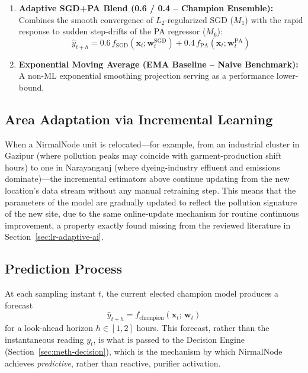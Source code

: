\begin{enumerate}[label=\textbf{M\arabic*:},leftmargin=*]
    \item \textbf{Adaptive SGD+PA Blend (0.6 / 0.4 -- Champion Ensemble):} Combines the smooth convergence of $L_2$-regularized SGD ($M_1$) with the rapid response to sudden step-drifts of the PA regressor ($M_6$):
    \begin{equation}
    \hat{y}_{t+h} = 0.6\, f_{\text{SGD}}(\mathbf{x}_t; \mathbf{w}_t^{\text{SGD}}) + 0.4\, f_{\text{PA}}(\mathbf{x}_t; \mathbf{w}_t^{\text{PA}})
    \label{eq:blend}
    \end{equation}
    \item \textbf{Exponential Moving Average (EMA Baseline -- Naive Benchmark):} A non-ML exponential smoothing projection serving as a performance lower-bound.
\end{enumerate}

\subsection{Area Adaptation via Incremental Learning}
When a NirmalNode unit is relocated—for example, from an industrial cluster in Gazipur (where pollution peaks may coincide with garment-production shift hours) to one in Narayanganj (where dyeing-industry effluent and emissions dominate)—the incremental estimators above continue updating from the new location's data stream without any manual retraining step. This means that the parameters of the model are gradually updated to reflect the pollution signature of the new site, due to the same online-update mechanism for routine continuous improvement, a property exactly found missing from the reviewed literature in Section~\ref{sec:lr-adaptive-ai}.

\subsection{Prediction Process}
At each sampling instant $t$, the current elected champion model produces a forecast
\begin{equation}
\hat{y}_{t+h} = f_{\text{champion}}(\mathbf{x}_t;\, \mathbf{w}_t)
\label{eq:forecast}
\end{equation}
for a look-ahead horizon $h \in [1,2]$ hours. This forecast, rather than the instantaneous reading $y_t$, is what is passed to the Decision Engine (Section~\ref{sec:meth-decision}), which is the mechanism by which NirmalNode achieves \emph{predictive}, rather than reactive, purifier activation.


